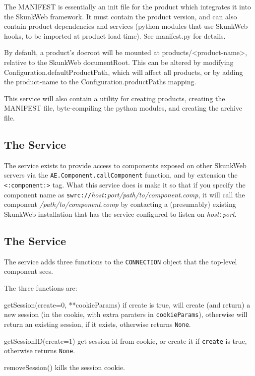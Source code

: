 \documentclass{manual}
\begin{document}
The MANIFEST is essentially an init file for the product which
integrates it into the SkunkWeb framework.  It must contain the
product version, and can also contain product dependencies and
services (python modules that use SkunkWeb hooks, to be imported at
product load time).  See manifest.py for details.

By default, a product's docroot will be mounted at
products/<product-name>, relative to the SkunkWeb documentRoot.  This
can be altered by modifying Configuration.defaultProductPath, which
will affect all products, or by adding the product-name to the
Configuration.productPaths mapping.

This service will also contain a utility for creating products, creating
the MANIFEST file, byte-compiling the python modules, and creating the
archive file.

\subsection{The  Service}
The  service exists to provide access to
components exposed on other SkunkWeb servers via the
\texttt{AE.Component.callComponent} function, and by extension the
\texttt{<:component:>} tag.  What this service does is make it so that if you specify the component name as \texttt{swrc://}\emph{host}\texttt{:}\emph{port/path/to/component.comp}, it will call the component \emph{/path/to/component.comp} by contacting a (presumably) existing SkunkWeb installation that has the  service configured to listen on \emph{host}\texttt{:}\emph{port}.

\subsection{The  Service}

The  service adds three functions to the
\texttt{CONNECTION}  object that the
top-level component sees.

The three functions are:
\begin{argdesc}
\item[getSession(create=0, **cookieParams)] if create is true, will
create (and return) a new session (in the cookie, with extra paraters
in \texttt{cookieParams}), otherwise will return an existing session, if it
exists, otherwise returns \texttt{None}.
\item[getSessionID(create=1)] get session id from cookie, or create it if \texttt{create} is true, otherwise returns \texttt{None}.
\item[removeSession()] kills the session cookie.
\end{argdesc}
\end{document}
